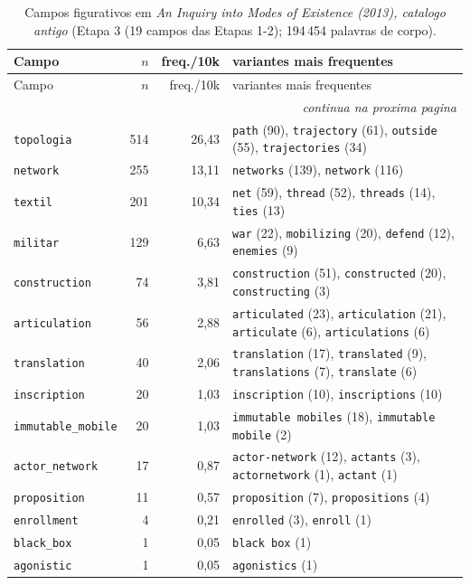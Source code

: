 {\footnotesize
\begin{longtable}{@{}l r r >{\raggedright\arraybackslash}p{6.4cm}@{}}
\caption{Campos figurativos em \emph{An Inquiry into Modes of Existence (2013), catalogo antigo} (Etapa 3 (19 campos das Etapas 1-2); 194\,454 palavras de corpo).}\label{tab:campos-aimeA}\\
\toprule
Campo & $n$ & freq./10k & variantes mais frequentes \\
\midrule \endfirsthead
\toprule Campo & $n$ & freq./10k & variantes mais frequentes \\ \midrule \endhead
\midrule \multicolumn{4}{r}{\footnotesize \emph{continua na proxima pagina}}\\ \endfoot
\bottomrule \endlastfoot
\texttt{topologia} & 514 & 26{,}43 & \texttt{path} (90), \texttt{trajectory} (61), \texttt{outside} (55), \texttt{trajectories} (34) \\
\texttt{network} & 255 & 13{,}11 & \texttt{networks} (139), \texttt{network} (116) \\
\texttt{textil} & 201 & 10{,}34 & \texttt{net} (59), \texttt{thread} (52), \texttt{threads} (14), \texttt{ties} (13) \\
\texttt{militar} & 129 & 6{,}63 & \texttt{war} (22), \texttt{mobilizing} (20), \texttt{defend} (12), \texttt{enemies} (9) \\
\texttt{construction} & 74 & 3{,}81 & \texttt{construction} (51), \texttt{constructed} (20), \texttt{constructing} (3) \\
\texttt{articulation} & 56 & 2{,}88 & \texttt{articulated} (23), \texttt{articulation} (21), \texttt{articulate} (6), \texttt{articulations} (6) \\
\texttt{translation} & 40 & 2{,}06 & \texttt{translation} (17), \texttt{translated} (9), \texttt{translations} (7), \texttt{translate} (6) \\
\texttt{inscription} & 20 & 1{,}03 & \texttt{inscription} (10), \texttt{inscriptions} (10) \\
\texttt{immutable\_mobile} & 20 & 1{,}03 & \texttt{immutable mobiles} (18), \texttt{immutable mobile} (2) \\
\texttt{actor\_network} & 17 & 0{,}87 & \texttt{actor-network} (12), \texttt{actants} (3), \texttt{actornetwork} (1), \texttt{actant} (1) \\
\texttt{proposition} & 11 & 0{,}57 & \texttt{proposition} (7), \texttt{propositions} (4) \\
\texttt{enrollment} & 4 & 0{,}21 & \texttt{enrolled} (3), \texttt{enroll} (1) \\
\texttt{black\_box} & 1 & 0{,}05 & \texttt{black box} (1) \\
\texttt{agonistic} & 1 & 0{,}05 & \texttt{agonistics} (1) \\
\end{longtable}}

